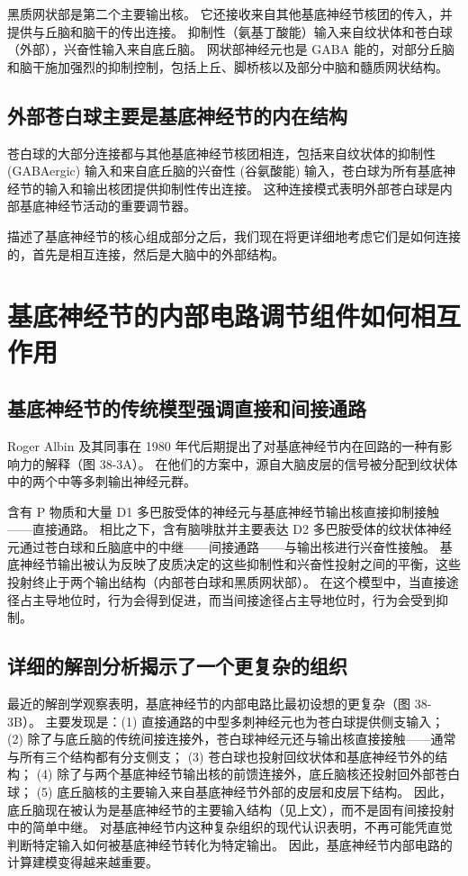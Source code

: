 黑质网状部是第二个主要输出核。 它还接收来自其他基底神经节核团的传入，并提供与丘脑和脑干的传出连接。 抑制性（氨基丁酸能）输入来自纹状体和苍白球（外部），兴奋性输入来自底丘脑。 网状部神经元也是 GABA 能的，对部分丘脑和脑干施加强烈的抑制控制，包括上丘、脚桥核以及部分中脑和髓质网状结构。


\subsection{外部苍白球主要是基底神经节的内在结构}
苍白球的大部分连接都与其他基底神经节核团相连，包括来自纹状体的抑制性 (GABAergic) 输入和来自底丘脑的兴奋性 (谷氨酸能) 输入，苍白球为所有基底神经节的输入和输出核团提供抑制性传出连接。 这种连接模式表明外部苍白球是内部基底神经节活动的重要调节器。

描述了基底神经节的核心组成部分之后，我们现在将更详细地考虑它们是如何连接的，首先是相互连接，然后是大脑中的外部结构。


\section{基底神经节的内部电路调节组件如何相互作用}
\subsection{基底神经节的传统模型强调直接和间接通路}
Roger Albin 及其同事在 1980 年代后期提出了对基底神经节内在回路的一种有影响力的解释（图 38-3A）。 在他们的方案中，源自大脑皮层的信号被分配到纹状体中的两个中等多刺输出神经元群。

含有 P 物质和大量 D1 多巴胺受体的神经元与基底神经节输出核直接抑制接触——直接通路。 相比之下，含有脑啡肽并主要表达 D2 多巴胺受体的纹状体神经元通过苍白球和丘脑底中的中继——间接通路——与输出核进行兴奋性接触。 基底神经节输出被认为反映了皮质决定的这些抑制性和兴奋性投射之间的平衡，这些投射终止于两个输出结构（内部苍白球和黑质网状部）。 在这个模型中，当直接途径占主导地位时，行为会得到促进，而当间接途径占主导地位时，行为会受到抑制。

\subsection{详细的解剖分析揭示了一个更复杂的组织}
最近的解剖学观察表明，基底神经节的内部电路比最初设想的更复杂（图 38-3B）。 主要发现是：(1) 直接通路的中型多刺神经元也为苍白球提供侧支输入； (2) 除了与底丘脑的传统间接连接外，苍白球神经元还与输出核直接接触——通常与所有三个结构都有分支侧支； (3) 苍白球也投射回纹状体和基底神经节外的结构； (4) 除了与两个基底神经节输出核的前馈连接外，底丘脑核还投射回外部苍白球； (5) 底丘脑核的主要输入来自基底神经节外部的皮层和皮层下结构。 因此，底丘脑现在被认为是基底神经节的主要输入结构（见上文），而不是固有间接投射中的简单中继。 对基底神经节内这种复杂组织的现代认识表明，不再可能凭直觉判断特定输入如何被基底神经节转化为特定输出。 因此，基底神经节内部电路的计算建模变得越来越重要。

